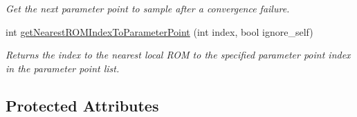 \begin{DoxyCompactItemize}
\begin{DoxyCompactList}\small\item\em Get the next parameter point to sample after a convergence failure. \end{DoxyCompactList}\item 
int \hyperlink{class_c_a_r_o_m_1_1_greedy_parameter_point_sampler_a646135aad9e1521b053aca4b6833fd16}{get\-Nearest\-R\-O\-M\-Index\-To\-Parameter\-Point} (int index, bool ignore\-\_\-self)
\begin{DoxyCompactList}\small\item\em Returns the index to the nearest local R\-O\-M to the specified parameter point index in the parameter point list. \end{DoxyCompactList}\end{DoxyCompactItemize}
\subsection*{Protected Attributes}
